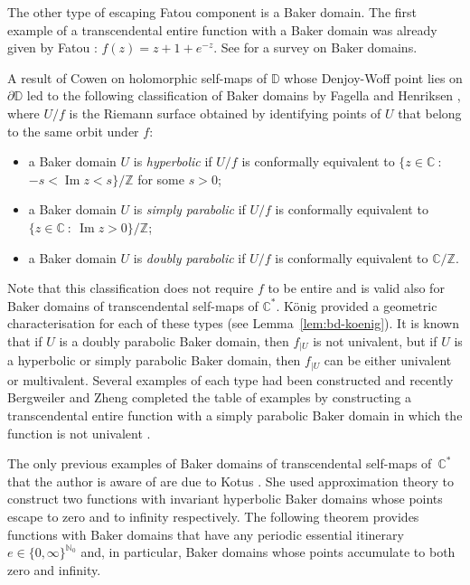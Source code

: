 \documentclass[a4paper, 12pt, reqno]{amsart}
\numberwithin{equation}{section}
\theoremstyle{plain}
\theoremstyle{definition}
\theoremstyle{remark}
\newcommand{\C}{{\mathbb{C}}}
\newcommand{\Z}{{\mathbb{Z}}}
\newcommand{\N}{{\mathbb{N}}}
\renewcommand{\Im}{\operatorname{Im}}
\begin{document}
The other type of escaping Fatou component is a Baker domain. The first example of a transcendental entire function with a Baker domain was already given by Fatou \cite{fatou26}: $f(z)=z+1+e^{-z}$. See \cite{rippon08} for a survey on Baker domains. 

A result of Cowen \cite{cowen81} on holomorphic self-maps of $\mathbb D$ whose Denjoy-Woff point lies on $\partial \mathbb D$ led to the following classification of Baker domains by Fagella and Henriksen \cite{fagella-henriksen06}, where $U/f$ is the Riemann surface obtained by identifying points of $U$ that belong to the same orbit under $f$: 
\begin{itemize}
\item a Baker domain $U$ is \textit{hyperbolic} if $U/f$ is conformally equivalent to $\{z\in\C\ :$\linebreak $-s<\Im z<s\}/\Z$ for some $s>0$;
\item a Baker domain $U$ is \textit{simply parabolic} if $U/f$ is conformally equivalent to $\{z\in\C\ :\ \Im z>0\}/\Z$;
\item a Baker domain $U$ is \textit{doubly parabolic} if $U/f$ is conformally equivalent to $\C/\Z$.
\end{itemize}
Note that this classification does not require $f$ to be entire and is valid also for Baker domains of transcendental self-maps of $\C^*$. K\"onig \cite{koenig99} provided a geometric characterisation for each of these types (see Lemma~\ref{lem:bd-koenig}). It is known that if $U$ is a doubly parabolic Baker domain, then $f_{|U}$ is not univalent, but if $U$ is a hyperbolic or simply parabolic Baker domain, then $f_{|U}$ can be either univalent or multivalent. Several examples of each type had been constructed and recently Bergweiler and Zheng completed the table of examples by constructing a transcendental entire function with a simply parabolic Baker domain in which the function is not univalent \cite[Theorem~1.1]{bergweiler-zheng12}.

The only previous examples of Baker domains of transcendental self-maps of~$\C^*$ that the author is aware of are due to Kotus \cite{kotus90}. She used approximation \mbox{theory} to construct two functions with invariant hyperbolic Baker domains whose points escape to zero and to infinity respectively. The following theorem provides functions with Baker domains that have any periodic essential itinerary $e\in\{0,\infty\}^{\N_0}$ and, in particular, Baker domains whose points accumulate to both zero and infinity.
\end{document}
